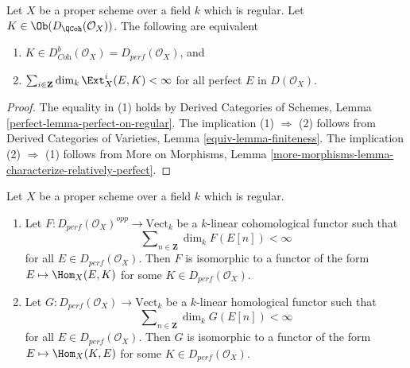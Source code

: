 \begin{lemma}
\label{lemma-characterize-dbcoh-proper-regular}
Let $X$ be a proper scheme over a field $k$ which is regular. Let
$K \in \Ob(D_\QCoh(\mathcal{O}_X))$. The following are equivalent
\begin{enumerate}
\item $K \in D^b_{\textit{Coh}}(\mathcal{O}_X) = D_{perf}(\mathcal{O}_X)$, and
\item $\sum_{i \in \mathbf{Z}} \dim_k \Ext^i_X(E, K) < \infty$
for all perfect $E$ in $D(\mathcal{O}_X)$.
\end{enumerate}
\end{lemma}

\begin{proof}
The equality in (1) holds by Derived Categories of Schemes,
Lemma \ref{perfect-lemma-perfect-on-regular}.
The implication (1) $\Rightarrow$ (2) follows from
Derived Categories of Varieties, Lemma \ref{equiv-lemma-finiteness}.
The implication (2) $\Rightarrow$ (1) follows from
More on Morphisms, Lemma
\ref{more-morphisms-lemma-characterize-relatively-perfect}.
\end{proof}

\begin{lemma}
\label{lemma-bondal-van-den-bergh}
Let $X$ be a proper scheme over a field $k$ which is regular.
\begin{enumerate}
\item Let $F : D_{perf}(\mathcal{O}_X)^{opp} \to \text{Vect}_k$
be a $k$-linear cohomological functor such that
$$
\sum\nolimits_{n \in \mathbf{Z}} \dim_k F(E[n]) < \infty
$$
for all $E \in D_{perf}(\mathcal{O}_X)$. Then $F$ is isomorphic to a functor
of the form $E \mapsto \Hom_X(E, K)$ for some $K \in D_{perf}(\mathcal{O}_X)$.
\item Let $G : D_{perf}(\mathcal{O}_X) \to \text{Vect}_k$
be a $k$-linear homological functor such that
$$
\sum\nolimits_{n \in \mathbf{Z}} \dim_k G(E[n]) < \infty
$$
for all $E \in D_{perf}(\mathcal{O}_X)$. Then $G$ is isomorphic to a functor
of the form $E \mapsto \Hom_X(K, E)$ for some $K \in D_{perf}(\mathcal{O}_X)$.
\end{enumerate}
\end{lemma}

